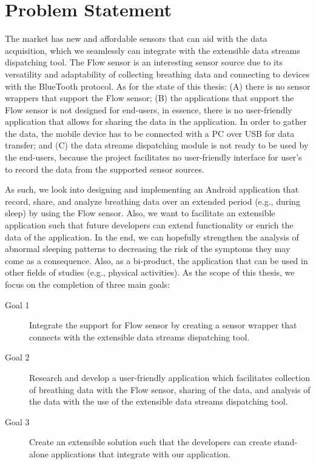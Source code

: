 \section{Problem Statement}

The market has new and affordable sensors that can aid with the data acquisition, which we seamlessly can integrate with the extensible data streams dispatching tool. The Flow sensor is an interesting sensor source due to its versatility and adaptability of collecting breathing data and connecting to devices with the BlueTooth protocol. As for the state of this thesis: (A) there is no sensor wrappers that support the Flow sensor; (B) the applications that support the Flow sensor is not designed for end-users, in essence, there is no user-friendly application that allows for sharing the data in the application. In order to gather the data, the mobile device has to be connected with a PC over USB for data transfer; and (C) the data streams dispatching module is not ready to be used by the end-users, because the project facilitates no user-friendly interface for user's to record the data from the supported sensor sources.

As such, we look into designing and implementing an Android application that record, share, and analyze breathing data over an extended period (e.g., during sleep) by using the Flow sensor. Also, we want to facilitate an extensible application such that future developers can extend functionality or enrich the data of the application. In the end, we can hopefully strengthen the analysis of abnormal sleeping patterns to decreasing the risk of the symptoms they may come as a consequence. Also, as a bi-product, the application that can be used in other fields of studies (e.g., physical activities). As the scope of this thesis, we focus on the completion of three main goals:

\begin{description}
    \item[Goal 1] Integrate the support for Flow sensor by creating a sensor wrapper that connects with the extensible data streams dispatching tool.
    \item[Goal 2] Research and develop a user-friendly application which facilitates collection of breathing data with the Flow sensor, sharing of the data, and analysis of the data with the use of the extensible data streams dispatching tool.
    \item[Goal 3] Create an extensible solution such that the developers can create stand-alone applications that integrate with our application. 
\end{description}

